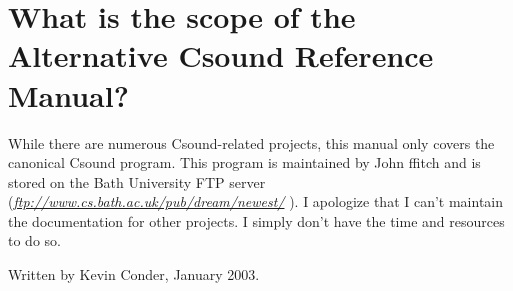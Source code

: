 \begin{comment}
\documentclass[10pt]{article}
\usepackage{fullpage, graphicx, url}
\setlength{\parskip}{1ex}
\setlength{\parindent}{0ex}
\title{What is the scope of the Alternative Csound Reference Manual?}



\begin{tabular}{ccc}
The Alternative Csound Reference Manual & & \\
Previous &Preface &Next

\end{tabular}

\end{comment}
\section{What is the scope of the Alternative Csound Reference Manual?}


  While there are numerous Csound-related projects, this manual only covers the canonical Csound program. This program is maintained by John ffitch and is stored on the Bath University FTP server (\emph{\url{ftp://www.cs.bath.ac.uk/pub/dream/newest/}}
). I apologize that I can't maintain the documentation for other projects. I simply don't have the time and resources to do so. 


  Written by Kevin Conder, January 2003. 


\begin{comment}
\begin{tabular}{lcr}
Previous &Home &Next \\
Why is this called the \emph{Alternative}
 Csound Reference Manual? &Up &Where is the documentation for the CsoundAV project?

\end{tabular}



\end{comment}
